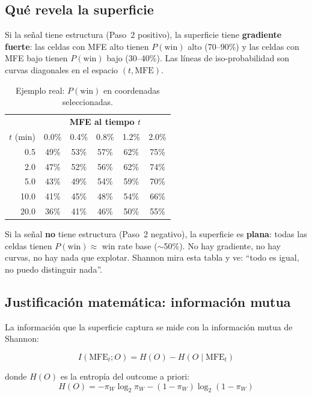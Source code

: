\documentclass[11pt,a4paper]{article}
\newcommand{\pw}{P(\text{win})}
\begin{document}
\subsection{Qu\'e revela la superficie}

Si la se\~nal tiene estructura (Paso~2 positivo), la superficie tiene
\textbf{gradiente fuerte}: las celdas con MFE alto tienen $\pw$ alto
(70--90\%) y las celdas con MFE bajo tienen $\pw$ bajo (30--40\%).
Las l\'ineas de iso-probabilidad son curvas diagonales en el espacio
$(t, \text{MFE})$.

\begin{table}[H]
\centering
\caption{Ejemplo real: $\pw$ en coordenadas seleccionadas.}
\begin{tabular}{r|ccccc}
\toprule
& \multicolumn{5}{c}{\textbf{MFE al tiempo $t$}} \\
$t$ (min) & 0.0\% & 0.4\% & 0.8\% & 1.2\% & 2.0\% \\
\midrule
0.5 & 49\% & 53\% & 57\% & 62\% & 75\% \\
2.0 & 47\% & 52\% & 56\% & 62\% & 74\% \\
5.0 & 43\% & 49\% & 54\% & 59\% & 70\% \\
10.0 & 41\% & 45\% & 48\% & 54\% & 66\% \\
20.0 & 36\% & 41\% & 46\% & 50\% & 55\% \\
\bottomrule
\end{tabular}
\end{table}

Si la se\~nal \textbf{no} tiene estructura (Paso~2 negativo), la
superficie es \textbf{plana}: todas las celdas tienen $\pw \approx$
win rate base ($\sim$50\%). No hay gradiente, no hay curvas, no hay
nada que explotar. Shannon mira esta tabla y ve: ``todo es igual,
no puedo distinguir nada''.

\subsection{Justificaci\'on matem\'atica: informaci\'on mutua}

La informaci\'on que la superficie captura se mide con la
informaci\'on mutua de Shannon:

\begin{equation}
I(\text{MFE}_t; O) = H(O) - H(O \mid \text{MFE}_t)
\end{equation}

donde $H(O)$ es la entrop\'ia del outcome a priori:
\begin{equation}
H(O) = -\pi_W \log_2 \pi_W - (1-\pi_W) \log_2(1-\pi_W)
\end{equation}
\end{document}
